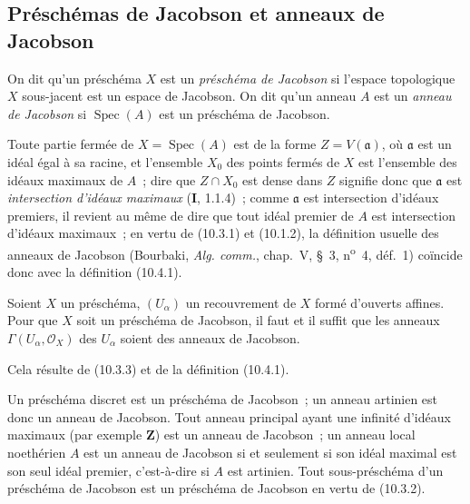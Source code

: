 \subsection{Préschémas de Jacobson et anneaux de Jacobson}
\label{subsection:IV.10.4-fr}

\begin{definition}[10.4.1]
\label{IV.10.4.1-fr}
On dit qu'un préschéma $X$ est un \emph{préschéma de Jacobson} si l'espace
topologique $X$ sous-jacent est un espace de Jacobson. On dit qu'un anneau
$A$ est un \emph{anneau de Jacobson} si $\operatorname{Spec}(A)$ est un
préschéma de Jacobson.
\end{definition}

Toute partie fermée de $X=\operatorname{Spec}(A)$ est de la forme
$Z=V(\mathfrak a)$, où $\mathfrak a$ est un idéal égal à sa racine, et
l'ensemble $X_0$ des points fermés de $X$ est l'ensemble des idéaux maximaux
de $A$~; dire que $Z\cap X_0$ est dense dans $Z$ signifie donc que
$\mathfrak a$ est \emph{intersection d'idéaux maximaux} (\textbf{I}, 1.1.4)~;
comme $\mathfrak a$ est intersection d'idéaux premiers, il revient au même de
dire que tout idéal premier de $A$ est intersection d'idéaux maximaux~; en
vertu de (10.3.1) et (10.1.2), la définition usuelle des anneaux de Jacobson
(Bourbaki, \emph{Alg. comm.}, chap.~V, \S~3, n\textsuperscript{o}~4, déf.~1)
coïncide donc avec la définition (10.4.1).

\begin{proposition}[10.4.2]
\label{IV.10.4.2-fr}
Soient $X$ un préschéma, $(U_\alpha)$ un recouvrement de $X$ formé d'ouverts
affines. Pour que $X$ soit un préschéma de Jacobson, il faut et il suffit que
les anneaux $\Gamma(U_\alpha,\mathcal O_X)$ des $U_\alpha$ soient des anneaux
de Jacobson.
\end{proposition}

Cela résulte de (10.3.3) et de la définition (10.4.1).

\begin{env}[10.4.3]
\label{IV.10.4.3-fr}
Un préschéma discret est un préschéma de Jacobson~; un anneau artinien est donc
un anneau de Jacobson. Tout anneau principal ayant une infinité d'idéaux
maximaux (par exemple $\mathbf Z$) est un anneau de Jacobson~; un anneau local
noethérien $A$ est un anneau de Jacobson si et seulement si son idéal maximal
est son seul idéal premier, c'est-à-dire si $A$ est artinien. Tout
sous-préschéma d'un préschéma de Jacobson est un préschéma de Jacobson en vertu
de (10.3.2).
\end{env}

